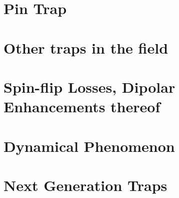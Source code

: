 \documentclass[defaultstyle,11pt]{thesis}
\begin{document}
\section{Pin Trap}

\section{Other traps in the field}

\section{Spin-flip Losses, Dipolar Enhancements thereof}

\section{Dynamical Phenomenon}

\section{Next Generation Traps}



\end{document}
